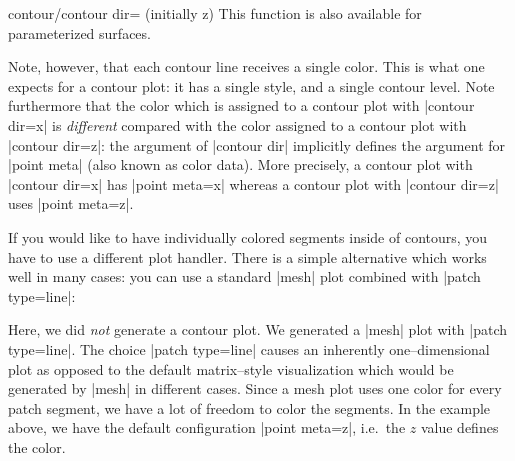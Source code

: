 {{\begin{pgfplotskey}{contour/contour dir= (initially z)}
	This function is also available for parameterized surfaces.

\pgfplotsexpensiveexample
\begin{codeexample}[]
\end{codeexample}

	Note, however, that each contour line receives a single color. This is what one expects for a contour plot: it has a single style, and a single contour level. Note furthermore that the color which is assigned to a contour plot with |contour dir=x| is \emph{different} compared with the color assigned to a contour plot with |contour dir=z|: the argument of |contour dir| implicitly defines the argument for |point meta| (also known as color data). More precisely, a contour plot with |contour dir=x| has |point meta=x| whereas a contour plot with |contour dir=z| uses |point meta=z|.

	If you would like to have individually colored segments inside of contours, you have to use a different plot handler. There is a simple alternative which works well in many cases: you can use a standard |mesh| plot combined with |patch type=line|:

\pgfplotsexpensiveexample
\begin{codeexample}[]
\end{codeexample}
	
	Here, we did \emph{not} generate a contour plot. We generated a |mesh| plot with |patch type=line|. The choice |patch type=line| causes an inherently one--dimensional plot as opposed to the default matrix--style visualization which would be generated by |mesh| in different cases. Since a mesh plot uses one color for every patch segment, we have a lot of freedom to color the segments. In the example above, we have the default configuration |point meta=z|, i.e.\ the $z$ value defines the color.


\end{pgfplotskey}}}
